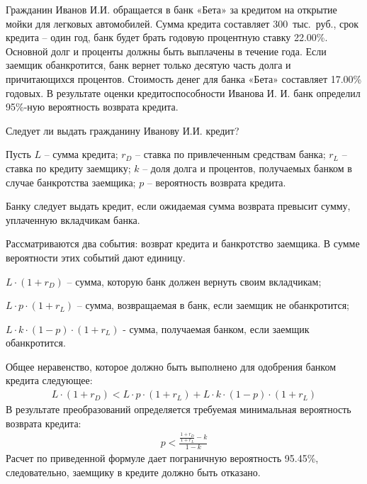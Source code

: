\documentclass[12pt, table]{exam}
\begin{document}
\begin{questions}
\begin{solution}[6em]
\end{solution}

\question[20] Гражданин Иванов И.И. обращается в банк «Бета» за кредитом на открытие мойки для легковых автомобилей. Сумма кредита составляет 300~тыс.~руб., срок кредита – один год, банк будет брать годовую процентную ставку 22.00\%. Основной долг и проценты должны быть выплачены в течение года. Если заемщик обанкротится, банк вернет только десятую часть долга и причитающихся процентов. Стоимость денег для банка «Бета» составляет 17.00\% годовых.  В результате оценки кредитоспособности Иванова И. И. банк определил 95\%-ную вероятность возврата кредита.
\noaddpoints

\begin{subparts}
\subpart[10] Следует ли выдать гражданину Иванову И.И. кредит?

\begin{solution}[6em]
Пусть $L$ – сумма кредита; $r_D$ – ставка по привлеченным средствам банка;  $r_L$ – ставка по кредиту заемщику; $k$ – доля долга и процентов, получаемых банком в случае банкротства заемщика; $p$ – вероятность возврата кредита.

Банку следует выдать кредит, если ожидаемая сумма возврата превысит сумму, уплаченную вкладчикам банка.

Рассматриваются два события: возврат кредита и банкротство заемщика. В сумме вероятности этих событий дают единицу. 

$L\cdot (1+r_D )$ – сумма, которую банк должен вернуть своим вкладчикам;

$L \cdot p \cdot (1+r_L )$ – сумма, возвращаемая в банк, если заемщик не обанкротится;

$L \cdot k \cdot (1-p) \cdot (1+r_L )$ - сумма, получаемая банком, если заемщик обанкротится.

Общее неравенство, которое должно быть выполнено для одобрения банком кредита следующее:
\begin{align*}
L\cdot (1+r_D )<L \cdot p \cdot (1+r_L ) + L \cdot k \cdot (1-p) \cdot (1+r_L )
\end{align*}
В результате преобразований определяется требуемая минимальная вероятность возврата кредита:
\begin{align*}
p<\frac{\frac{1+r_D}{1+r_L}-k}{1-k}
\end{align*}	
Расчет по приведенной формуле дает пограничную вероятность 95.45\%, следовательно, заемщику в кредите должно быть отказано.
\end{solution}


\end{subparts}
\end{questions}
\end{document}
